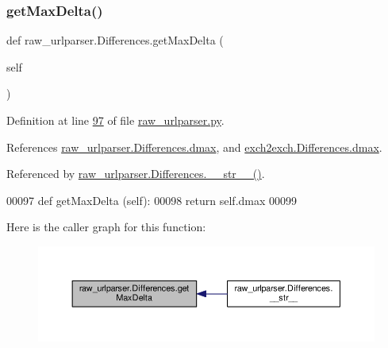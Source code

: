 \subsubsection{\texorpdfstring{get\+Max\+Delta()}{getMaxDelta()}}
{\footnotesize\ttfamily def raw\+\_\+urlparser.\+Differences.\+get\+Max\+Delta (\begin{DoxyParamCaption}\item[{}]{self }\end{DoxyParamCaption})}



Definition at line \hyperlink{raw__urlparser_8py_source_l00097}{97} of file \hyperlink{raw__urlparser_8py_source}{raw\+\_\+urlparser.\+py}.



References \hyperlink{raw__urlparser_8py_source_l00092}{raw\+\_\+urlparser.\+Differences.\+dmax}, and \hyperlink{exch2exch_8py_source_l00115}{exch2exch.\+Differences.\+dmax}.



Referenced by \hyperlink{raw__urlparser_8py_source_l00100}{raw\+\_\+urlparser.\+Differences.\+\_\+\+\_\+str\+\_\+\+\_\+()}.


\begin{DoxyCode}
00097     \textcolor{keyword}{def }getMaxDelta (self):
00098         \textcolor{keywordflow}{return} self.dmax
00099         
\end{DoxyCode}
Here is the caller graph for this function\+:
\nopagebreak
\begin{figure}[H]
\begin{center}
\leavevmode
\includegraphics[width=350pt]{classraw__urlparser_1_1_differences_acfa09d743c08cc813a5bc435aa6875da_icgraph}
\end{center}
\end{figure}
\mbox{\label{classraw__urlparser_1_1_differences_af19faaea85ca8ac0d327c8443ddd99ef}} 
